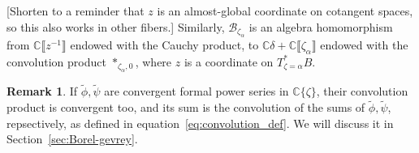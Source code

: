 \documentclass{article}
\newcommand{\C}{\mathbb{C}}
\newcommand{\series}[1]{\tilde{#1}}
\newcommand{\borel}{\mathcal{B}}
\theoremstyle{definition}
\newtheorem{remark}[definition]{Remark}
\theoremstyle{plain}
\newtheorem{prop}[definition]{Proposition}
\newenvironment{todo}{\color{Coral}}{\color{black}}
\begin{document}
\begin{todo}[Shorten to a reminder that $z$ is an almost-global coordinate on cotangent spaces, so this also works in other fibers.]\end{todo} Similarly, $\borel_{\zeta_\alpha}$ is an algebra homomorphism from $\C\llbracket z^{-1}\rrbracket$ endowed with the Cauchy product, to $\C\delta+\C\llbracket\zeta_\alpha\rrbracket$ endowed with the convolution product $\ast_{\zeta_\alpha,0}$, where $z$ is a coordinate on $T^*_{\zeta=\alpha}B$. %
\begin{remark}
   If $\series{\phi}, \series{\psi}$ are convergent formal power series in $\C\{\zeta\}$, their convolution product is convergent too, and its sum is the convolution of the sums of $\series{\phi}, \series{\psi}$, repsectively, as defined in equation~\eqref{eq:convolution_def}. We will discuss it in Section~\ref{sec:Borel-gevrey}. 
\end{remark}
%
\end{document}
